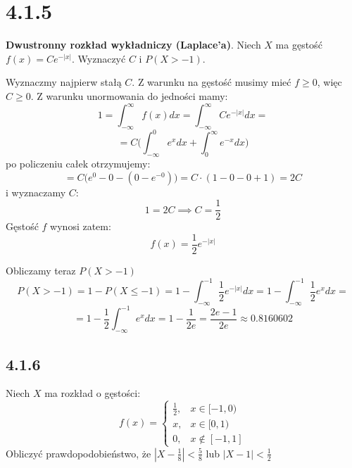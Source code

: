 \documentclass{article}
\begin{document}
\section*{4.1.5}
\begin{center}
    \textbf{Dwustronny rozkład wykładniczy (Laplace'a)}. Niech \(X\) ma gęstość \(f(x) = Ce^{-|x|}\).
    Wyznaczyć \(C\) i \(P(X > -1)\).
\end{center}
Wyznaczmy najpierw stałą \(C\). Z warunku na gęstość musimy mieć \(f \geq 0\), więc \(C \geq 0\). Z warunku unormowania do jedności mamy:
\begin{equation*}
    1 = \int_{-\infty}^{\infty} f(x)dx = \int_{-\infty}^{\infty} Ce^{-|x|} dx = 
\end{equation*}
\begin{equation*}
    = C \Big(\int_{-\infty}^{0} e^{x} dx + \int_{0}^{\infty} e^{-x} dx\Big)
\end{equation*}
po policzeniu całek otrzymujemy:
\begin{equation*}
    = C \Big(e^0 - 0 - (0 - e^{-0})\Big) = C \cdot (1 - 0 - 0 + 1) = 2C
\end{equation*}
i wyznaczamy \(C\):
\begin{equation*}
    1 = 2C \implies C = \frac{1}{2}
\end{equation*}
Gęstość \(f\) wynosi zatem:
\begin{equation*}
    f(x) = \frac{1}{2}e^{-|x|}
\end{equation*}
\par Obliczamy teraz \(P(X > -1)\)
\begin{equation*}
    P(X > -1) = 1 - P(X \leq -1) = 1 - \int_{-\infty}^{-1} \frac{1}{2}e^{-|x|} dx = 1 - \int_{-\infty}^{-1} \frac{1}{2}e^{x} dx = 
\end{equation*}
\begin{equation*}
    = 1 - \frac{1}{2} \int_{-\infty}^{-1} e^{x} dx = 1 - \frac{1}{2e} = \frac{2e - 1}{2e} \approx 0.8160602
\end{equation*}

\subsection*{4.1.6}
\begin{center}
    Niech \(X\) ma rozkład o gęstości:
    \begin{equation*}
        f(x) = 
            \begin{cases}
                \frac{1}{2},& x \in [-1, 0)\\
                x,& x \in [0, 1)\\
                0,& x \not\in [-1, 1] 
            \end{cases}
    \end{equation*}
    Obliczyć prawdopodobieństwo, że \(|X - \frac{1}{8}| < \frac{5}{8}\) lub \(|X - 1| < \frac{1}{2}\)
\end{center}
\end{document}
